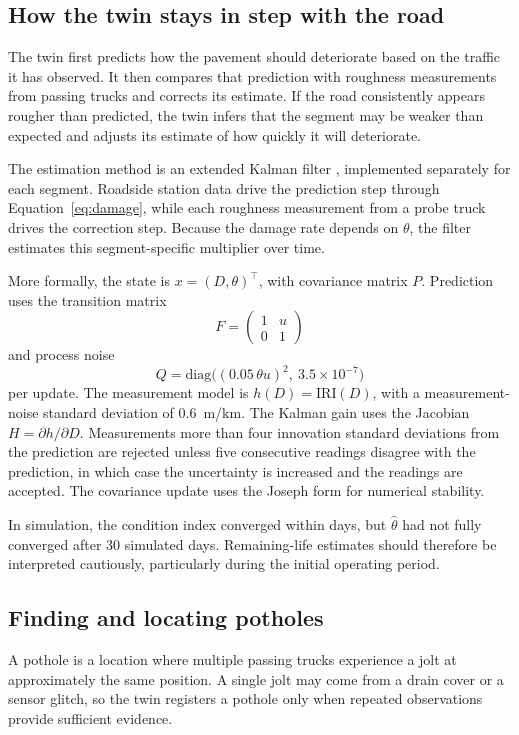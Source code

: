 \documentclass[11pt,a4paper]{article}
\begin{document}
\subsection{How the twin stays in step with the road}
The twin first predicts how the pavement should deteriorate based on the traffic it has observed. It then compares that prediction with roughness measurements from passing trucks and corrects its estimate. If the road consistently appears rougher than predicted, the twin infers that the segment may be weaker than expected and adjusts its estimate of how quickly it will deteriorate.

The estimation method is an extended Kalman filter \cite{kalman}, implemented separately for each segment. Roadside station data drive the prediction step through Equation~\eqref{eq:damage}, while each roughness measurement from a probe truck drives the correction step. Because the damage rate depends on $\theta$, the filter estimates this segment-specific multiplier over time.

More formally, the state is $x=(D,\theta)^{\top}$, with covariance matrix $P$. Prediction uses the transition matrix
\[
F=\begin{pmatrix}1&u\\0&1\end{pmatrix}
\]
and process noise
\[
Q=\mathrm{diag}\big((0.05\,\theta u)^2,\ 3.5\times10^{-7}\big)
\]
per update. The measurement model is $h(D)=\mathrm{IRI}(D)$, with a measurement-noise standard deviation of 0.6~m/km. The Kalman gain uses the Jacobian $H=\partial h/\partial D$. Measurements more than four innovation standard deviations from the prediction are rejected unless five consecutive readings disagree with the prediction, in which case the uncertainty is increased and the readings are accepted. The covariance update uses the Joseph form for numerical stability.

In simulation, the condition index converged within days, but $\hat\theta$ had not fully converged after 30 simulated days. Remaining-life estimates should therefore be interpreted cautiously, particularly during the initial operating period.

\subsection{Finding and locating potholes}
A pothole is a location where multiple passing trucks experience a jolt at approximately the same position. A single jolt may come from a drain cover or a sensor glitch, so the twin registers a pothole only when repeated observations provide sufficient evidence.
\end{document}
